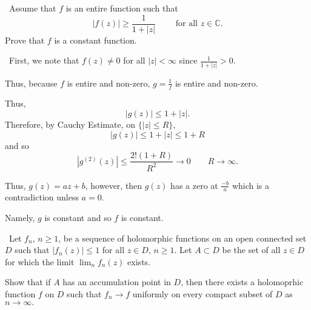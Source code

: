 \documentclass[12pt]{Qual}
\begin{document}
\begin{problem} $\,$
Assume that $f$ is an entire function such that $$|f(z)|\ge\frac{1}{1+|z|}\qquad\text{ for all }z\in\mathbb{C}.$$ Prove that $f$ is a constant function.
\end{problem}

\begin{solution}$\,$
First, we note that $f(z)\not=0$ for all $|z|<\infty$ since $\frac{1}{1+|z|}>0$.

Thus, because $f$ is entire and non-zero, $g=\frac{1}{f}$ is entire and non-zero.

Thus, $$|g(z)|\le 1+|z|.$$ Therefore, by Cauchy Estimate, on $\{|z|\le R\}$, $$|g(z)|\le 1+|z|\le 1+R$$ and so $$|g^{(2)}(z)|\le \frac{2!(1+R)}{R^2}\to0\qquad R\to\infty.$$

Thus, $g(z)=az+b$, however, then $g(z)$ has a zero at $\frac{-b}{a}$ which is a contradiction unless $a=0.$

Namely, $g$ is constant and so $f$ is constant.
\end{solution}
\newpage




\begin{problem} $\,$
Let $f_n$, $n\ge1$, be a sequence of holomorphic functions on an open connected set $D$ such that $|f_n(z)|\le 1$ for all $z\in D$, $n\ge1$. Let $A\subset D$ be the set of all $z\in D$ for which the limit $\lim_nf_n(z)$ exists.

Show that if $A$ has an accumulation point in $D$, then there exists a holomoprhic function $f$ on $D$ such that $f_n\to f$ uniformly on every compact subset of $D$ as $n\to\infty.$
\end{problem}
\end{document}
